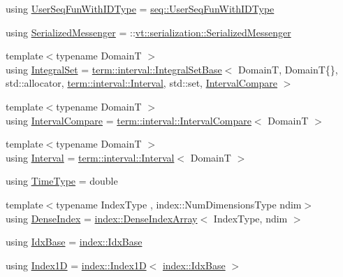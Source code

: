 \begin{DoxyCompactItemize}
\item 
using \hyperlink{namespacevt_a3170103960b4d8f8a0f722750bc0dcc9}{User\+Seq\+Fun\+With\+I\+D\+Type} = \hyperlink{namespacevt_1_1seq_a1a58d0ebe1d6bbed8438607a9c717779}{seq\+::\+User\+Seq\+Fun\+With\+I\+D\+Type}
\item 
using \hyperlink{namespacevt_a490b7af99bdeb06e988d94a7ab389b43}{Serialized\+Messenger} = \+::\hyperlink{structvt_1_1serialization_1_1_serialized_messenger}{vt\+::serialization\+::\+Serialized\+Messenger}
\item 
{\footnotesize template$<$typename DomainT $>$ }\\using \hyperlink{namespacevt_af8fc7210a3d8e598330cf3375857ef1e}{Integral\+Set} = \hyperlink{structvt_1_1term_1_1interval_1_1_integral_set_base}{term\+::interval\+::\+Integral\+Set\+Base}$<$ DomainT, DomainT\{\}, std\+::allocator, \hyperlink{structvt_1_1term_1_1interval_1_1_interval}{term\+::interval\+::\+Interval}, std\+::set, \hyperlink{namespacevt_ab51b754f1d22841f555246195fab9d41}{Interval\+Compare} $>$
\item 
{\footnotesize template$<$typename DomainT $>$ }\\using \hyperlink{namespacevt_ab51b754f1d22841f555246195fab9d41}{Interval\+Compare} = \hyperlink{structvt_1_1term_1_1interval_1_1_interval_compare}{term\+::interval\+::\+Interval\+Compare}$<$ DomainT $>$
\item 
{\footnotesize template$<$typename DomainT $>$ }\\using \hyperlink{namespacevt_a0036b5cb523aef3477d6d5de9d94eabb}{Interval} = \hyperlink{structvt_1_1term_1_1interval_1_1_interval}{term\+::interval\+::\+Interval}$<$ DomainT $>$
\item 
using \hyperlink{namespacevt_a876a9d0cd5a952859c72de8a46881442}{Time\+Type} = double
\item 
{\footnotesize template$<$typename Index\+Type , index\+::\+Num\+Dimensions\+Type ndim$>$ }\\using \hyperlink{namespacevt_ac016d9c31465ce11c14eab2be11f9183}{Dense\+Index} = \hyperlink{structvt_1_1index_1_1_dense_index_array}{index\+::\+Dense\+Index\+Array}$<$ Index\+Type, ndim $>$
\item 
using \hyperlink{namespacevt_afb96657e28fa98eb685c5e0c6b1b122e}{Idx\+Base} = \hyperlink{namespacevt_1_1index_a0dbb8d47463da27c1436e8e4ddb02743}{index\+::\+Idx\+Base}
\item 
using \hyperlink{namespacevt_a5540efc78234273e1796fb003fe4d234}{Index1D} = \hyperlink{namespacevt_1_1index_a091a4f5a7a2c993d9727eaa60cf67d81}{index\+::\+Index1D}$<$ \hyperlink{namespacevt_1_1index_a0dbb8d47463da27c1436e8e4ddb02743}{index\+::\+Idx\+Base} $>$

\end{DoxyCompactItemize}
